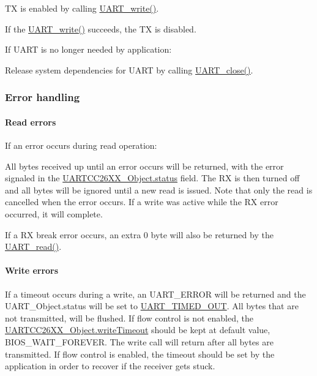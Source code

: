 \begin{DoxyItemize}
\item T\+X is enabled by calling \hyperlink{_u_a_r_t_8h_a6f2a04c09dc17886e69e361cd80aaedc}{U\+A\+R\+T\+\_\+write()}.
\item If the \hyperlink{_u_a_r_t_8h_a6f2a04c09dc17886e69e361cd80aaedc}{U\+A\+R\+T\+\_\+write()} succeeds, the T\+X is disabled.
\end{DoxyItemize}If U\+A\+R\+T is no longer needed by application\+:
\begin{DoxyItemize}
\item Release system dependencies for U\+A\+R\+T by calling \hyperlink{_u_a_r_t_8h_a6b49b65f3db709c408dc4db23a68895d}{U\+A\+R\+T\+\_\+close()}.
\end{DoxyItemize}

\subsubsection*{Error handling}

\paragraph*{Read errors}

If an error occurs during read operation\+:
\begin{DoxyItemize}
\item All bytes received up until an error occurs will be returned, with the error signaled in the \hyperlink{struct_u_a_r_t_c_c26_x_x___object_a10ff4c367c40263e72d3494f78b9ce07}{U\+A\+R\+T\+C\+C26\+X\+X\+\_\+\+Object.\+status} field. The R\+X is then turned off and all bytes will be ignored until a new read is issued. Note that only the read is cancelled when the error occurs. If a write was active while the R\+X error occurred, it will complete.
\item If a R\+X break error occurs, an extra 0 byte will also be returned by the \hyperlink{_u_a_r_t_8h_a023152d57539cad94bdd813956013e73}{U\+A\+R\+T\+\_\+read()}.
\end{DoxyItemize}\paragraph*{Write errors}

If a timeout occurs during a write, an U\+A\+R\+T\+\_\+\+E\+R\+R\+O\+R will be returned and the U\+A\+R\+T\+\_\+\+Object.\+status will be set to \hyperlink{_u_a_r_t_c_c26_x_x_8h_a778bbef5f4b52a5651552136715f53c4aa965b1df388dcc5c87f1bb51120877c7}{U\+A\+R\+T\+\_\+\+T\+I\+M\+E\+D\+\_\+\+O\+U\+T}. All bytes that are not transmitted, will be flushed. If flow control is not enabled, the \hyperlink{struct_u_a_r_t_c_c26_x_x___object_a55b3ddd718d4de0aeffd2426c3f14efd}{U\+A\+R\+T\+C\+C26\+X\+X\+\_\+\+Object.\+write\+Timeout} should be kept at default value, B\+I\+O\+S\+\_\+\+W\+A\+I\+T\+\_\+\+F\+O\+R\+E\+V\+E\+R. The write call will return after all bytes are transmitted. If flow control is enabled, the timeout should be set by the application in order to recover if the receiver gets stuck.

